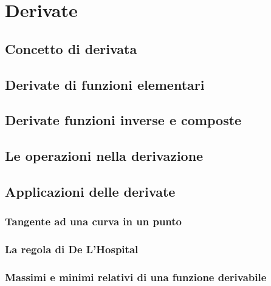 \chapter{Derivate}
\section{Concetto di derivata}
\section{Derivate di funzioni elementari}
\section{Derivate funzioni inverse e composte}
\section{Le operazioni nella derivazione}
\section{Applicazioni delle derivate}
\subsection{Tangente ad una curva in un punto}
\subsection{La regola di De L'Hospital}
\subsection{Massimi e minimi relativi di una funzione derivabile}
